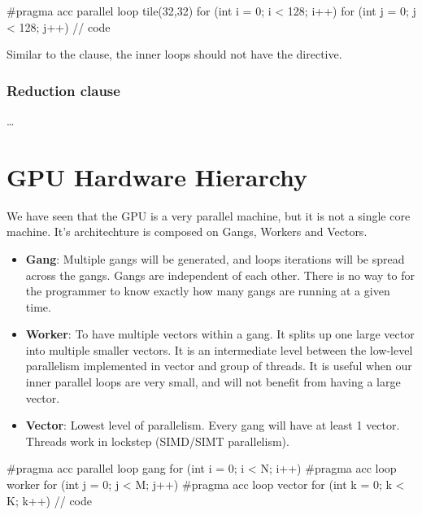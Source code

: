 \begin{codeblock}[language=C]
#pragma acc parallel loop tile(32,32)
for (int i = 0; i < 128; i++) {
    for (int j = 0; j < 128; j++) {
        // code
    }
}
\end{codeblock}

\begin{observationblock}[Note]
    Similar to the  clause, the inner loops should not have the  directive.
\end{observationblock}

\subsubsection{Reduction clause}

\dots

\section{GPU Hardware Hierarchy}

We have seen that the GPU is a very parallel machine, but it is not a single core machine. It's architechture is composed on Gangs, Workers and Vectors.

\begin{itemize}
    \item \textbf{Gang}: Multiple gangs will be generated, and loops iterations will be spread across the gangs. Gangs are independent of each other. There is no way to for the programmer to know exactly how many gangs are running at a given time.
    \item \textbf{Worker}: To have multiple vectors within a gang. It splits up one large vector into multiple smaller vectors. It is an intermediate level between the low-level parallelism implemented in vector and group of threads. It is useful when our inner parallel loops are very small, and will not benefit from having a large vector.
    \item \textbf{Vector}: Lowest level of parallelism. Every gang will have at least 1 vector. Threads work in lockstep (SIMD/SIMT parallelism).
\end{itemize}

\begin{codeblock}[language=C]
#pragma acc parallel loop gang
for (int i = 0; i < N; i++)
    #pragma acc loop worker
    for (int j = 0; j < M; j++)
        #pragma acc loop vector
        for (int k = 0; k < K; k++)
            // code
\end{codeblock}

